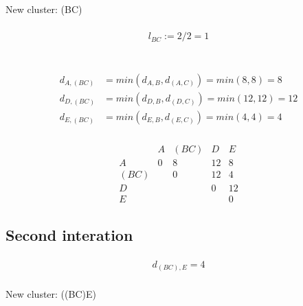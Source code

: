 \subsubsection*{\steptwo}
New cluster: (BC) 
\subsubsection*{\stepthree}
\[l_{BC} := 2 /2 = 1\] \\
\begin{center}
\end{center}
\subsubsection*{\stepfour}
\begin{align*}
    d_{A, (BC)} & = min(d_{A,B}, d_{(A,C)}) = min (8,8) = 8 \\
    d_{D, (BC)} & = min(d_{D,B}, d_{(D,C)}) = min (12,12) = 12 \\
    d_{E, (BC)} & = min(d_{E,B}, d_{(E,C)}) = min (4,4) = 4 
\end{align*}
\subsubsection*{\stepfive}
\[
\begin{array}{c|ccccc}
  & A & (BC) & D & E \\
\hline
A & 0& 8 & 12& 8 \\
(BC) &  & 0 & 12 & 4 \\
D &  &   & 0 & 12 \\
E &  &   &   & 0
\end{array}
\]
\subsection*{Second interation}
\subsubsection*{\stepone}
\[d_{(BC),E} = 4\]
\subsubsection*{\steptwo}
New cluster: ((BC)E)
